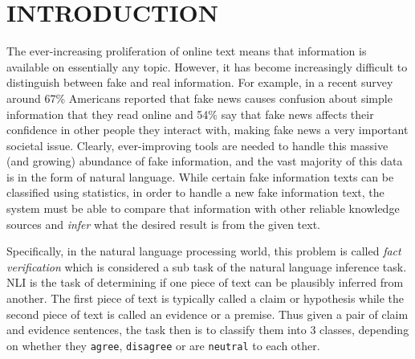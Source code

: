 \chapter{INTRODUCTION\label{chapter:introduction}}

The ever-increasing proliferation of online text means that information is available on essentially any topic. However, it has become increasingly difficult to distinguish between fake and real information. For example, in a recent survey around 67\% Americans reported that fake news causes confusion about simple information that they read online and 54\% say that fake news affects their confidence in other people they interact with, making fake news a very important societal issue. Clearly, ever-improving tools are needed to handle this massive (and growing) abundance of fake information, and the vast majority of this data is in the form of natural language. While certain fake information texts can be classified using statistics, in order to handle a new fake information text, the system must be able to compare that information with other reliable knowledge sources and \textit{infer} what the desired result is from the given text.



Specifically, in the natural language processing world, this problem is called \textit{fact verification} which is considered a sub task of the
natural language inference task. NLI is the task of determining if one piece of text can be plausibly inferred from another. The first piece of text is typically called a claim or hypothesis while the second piece of text is called an evidence or a premise. Thus given a pair of claim and evidence sentences, the task then is to classify them into 3 classes, depending on whether they \texttt{agree}, \texttt{disagree} or are \texttt{neutral} to each other.

